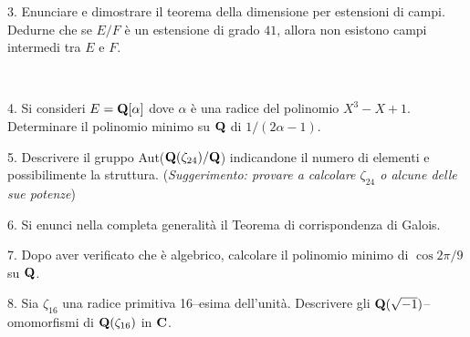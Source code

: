 \item{3.} Enunciare e dimostrare il teorema della dimensione per estensioni di campi. Dedurne che se $E/F$
\`e un estensione di grado $41$, allora non esistono campi intermedi tra $E$ e $F$. 

\ve\ \vs


\item{4.} Si consideri $E={\bf Q}[\alpha]$ dove $\alpha$ \`{e}
una radice del polinomio $X^3-X+1$. Determinare il polinomio minimo
su ${\bf Q}$ di $1/(2\alpha-1)$. \vv

\item{5.} Descrivere il gruppo Aut(${\bf Q}(\zeta_{24})/{\bf Q}$) indicandone
il numero di elementi e possibilimente la struttura. \hfill\break ({\it Suggerimento: provare
a calcolare $\zeta_{24}$ o alcune delle sue potenze})
\ve\ \vs


\item{6.} Si enunci nella completa generalit\`a il Teorema di
corrispondenza di Galois.\vv\vv


\item{7.}   Dopo aver verificato che \`e algebrico, calcolare
il polinomio minimo di $\cos 2\pi/9$ su ${\bf Q}$.
\vv\vv

\item{8.} Sia $\zeta_{16}$ una radice primitiva 16--esima
dell'unit\`a. Descrivere gli ${\bf Q}(\sqrt{-1})$--omomorfismi di
${\bf Q}(\zeta_{16})$ in ${\bf C}$.

\vv



\ \vst
 \bye
